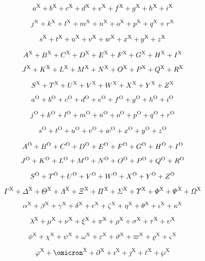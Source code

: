 $$
a^{\rm X}+
b^{\rm X}+
c^{\rm X}+
d^{\rm X}+
e^{\rm X}+
f^{\rm X}+
g^{\rm X}+
h^{\rm X}+
i^{\rm X} 
$$

$$
j^{\rm X}+
k^{\rm X}+
l^{\rm X}+
m^{\rm X}+
n^{\rm X}+
o^{\rm X}+
p^{\rm X}+
q^{\rm X}+
r^{\rm X}
$$

$$
s^{\rm X}+
t^{\rm X}+
u^{\rm X}+
v^{\rm X}+
w^{\rm X}+
x^{\rm X}+
y^{\rm X}+
z^{\rm X}
$$

$$
A^{\rm X}+
B^{\rm X}+
C^{\rm X}+
D^{\rm X}+
E^{\rm X}+
F^{\rm X}+
G^{\rm X}+
H^{\rm X}+
I^{\rm X}
$$

$$
J^{\rm X}+
K^{\rm X}+
L^{\rm X}+
M^{\rm X}+
N^{\rm X}+
O^{\rm X}+
P^{\rm X}+
Q^{\rm X}+
R^{\rm X}
$$

$$
S^{\rm X}+
T^{\rm X}+
U^{\rm X}+
V^{\rm X}+
W^{\rm X}+
X^{\rm X}+
Y^{\rm X}+
Z^{\rm X}
$$


$$
a^{\rm O}+
b^{\rm O}+
c^{\rm O}+
d^{\rm O}+
e^{\rm O}+
f^{\rm O}+
g^{\rm O}+
h^{\rm O}+
i^{\rm O}
$$

$$
j^{\rm O}+
k^{\rm O}+
l^{\rm O}+
m^{\rm O}+
n^{\rm O}+
o^{\rm O}+
p^{\rm O}+
q^{\rm O}+
r^{\rm O}
$$

$$
s^{\rm O}+
t^{\rm O}+
u^{\rm O}+
v^{\rm O}+
w^{\rm O}+
x^{\rm O}+
y^{\rm O}+
z^{\rm O}
$$

$$
A^{\rm O}+
B^{\rm O}+
C^{\rm O}+
D^{\rm O}+
E^{\rm O}+
F^{\rm O}+
G^{\rm O}+
H^{\rm O}+
I^{\rm O}
$$

$$
J^{\rm O}+
K^{\rm O}+
L^{\rm O}+
M^{\rm O}+
N^{\rm O}+
O^{\rm O}+
P^{\rm O}+
Q^{\rm O}+
R^{\rm O}
$$

$$
S^{\rm O}+
T^{\rm O}+
U^{\rm O}+
V^{\rm O}+
W^{\rm O}+
X^{\rm O}+
Y^{\rm O}+
Z^{\rm O}
$$



$$
\varGamma^{\rm X}+
\varDelta^{\rm X}+
\varTheta^{\rm X}+
\varLambda^{\rm X}+
\varXi^{\rm X}+
\varPi^{\rm X}+
\varSigma^{\rm X}+
\varUpsilon^{\rm X}+
\varPhi^{\rm X}+
\varPsi^{\rm X}+
\varOmega^{\rm X}
$$

$$
\alpha^{\rm X}+
\beta^{\rm X}+
\gamma^{\rm X}+
\delta^{\rm X}+
\epsilon^{\rm X}+
\zeta^{\rm X}+
\eta^{\rm X}+
\theta^{\rm X}+
\iota^{\rm X}+
\kappa^{\rm X}
$$

$$
\lambda^{\rm X}+
\mu^{\rm X}+
\nu^{\rm X}+
\xi^{\rm X}+
\pi^{\rm X}+
\rho^{\rm X}+
\sigma^{\rm X}+
\tau^{\rm X}+
\upsilon^{\rm X}
$$

$$
\phi^{\rm X}+
\chi^{\rm X}+
\psi^{\rm X}+
\omega^{\rm X}+
\varepsilon^{\rm X}+
\vartheta^{\rm X}+
\varpi^{\rm X}+
\varrho^{\rm X}+
\varsigma^{\rm X}
$$

$$
\varphi^{\rm X}+
\omicron^{\rm X}+
\partial^{\rm X}+
\imath^{\rm X}+
\jmath^{\rm X}+
\ell^{\rm X}+
\wp^{\rm X}
$$

